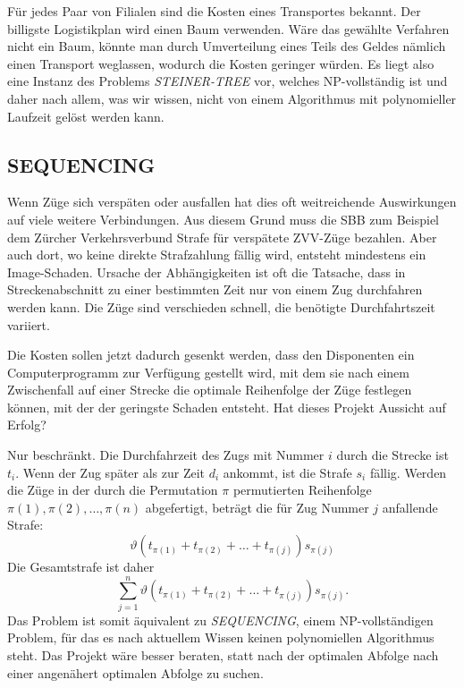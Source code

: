 \medskip

Für jedes Paar von Filialen sind die Kosten eines Transportes
bekannt. Der billigste Logistikplan wird einen Baum verwenden.
Wäre das gewählte Verfahren nicht ein Baum, könnte man
durch Umverteilung eines Teils des Geldes nämlich einen
Transport weglassen, wodurch die Kosten geringer würden.
Es liegt also eine Instanz des Problems {\it STEINER-TREE}
vor, welches NP-vollständig ist und daher nach allem, was
wir wissen, nicht von einem Algorithmus mit polynomieller
Laufzeit gelöst werden kann.

\subsection{SEQUENCING}
Wenn Züge sich verspäten oder ausfallen hat dies oft weitreichende
Auswirkungen auf viele weitere Verbindungen.
Aus diesem Grund muss die SBB zum Beispiel dem Zürcher Verkehrsverbund
Strafe für verspätete ZVV-Züge bezahlen. Aber auch dort, wo
keine direkte Strafzahlung fällig wird, entsteht mindestens ein
Image-Schaden. Ursache der Abhängigkeiten ist oft die Tatsache,
dass in Streckenabschnitt zu einer bestimmten Zeit nur von einem
Zug durchfahren werden kann. Die Züge sind verschieden schnell,
die benötigte Durchfahrtszeit variiert. 

Die Kosten sollen jetzt dadurch gesenkt werden, dass den Disponenten
ein Computerprogramm zur Verfügung gestellt wird, mit dem sie nach
einem Zwischenfall auf einer Strecke die optimale Reihenfolge der Züge
festlegen können, mit der der geringste Schaden entsteht.
Hat dieses Projekt Aussicht auf Erfolg?

\medskip

Nur beschränkt.
Die Durchfahrzeit des Zugs mit Nummer $i$ durch die Strecke ist $t_i$.
Wenn der Zug später als zur Zeit $d_i$ ankommt, ist die Strafe $s_i$
fällig.
Werden die Züge in der durch die Permutation $\pi$
permutierten Reihenfolge  $\pi(1),\pi(2),\dots,\pi(n)$ abgefertigt,
beträgt die für Zug Nummer $j$ anfallende Strafe:
\[
\vartheta(t_{\pi(1)}+t_{\pi(2)}+\dots+t_{\pi(j)})s_{\pi(j)}
\]
Die Gesamtstrafe ist daher
\[
\sum_{j=1}^n \vartheta(t_{\pi(1)}+t_{\pi(2)}+\dots+t_{\pi(j)})s_{\pi(j)}.
\]
Das Problem ist somit äquivalent zu {\it SEQUENCING}, einem
NP-vollständigen Problem, für das es nach aktuellem Wissen keinen
polynomiellen Algorithmus steht. Das Projekt wäre besser beraten,
statt nach der optimalen Abfolge nach einer angenähert optimalen Abfolge
zu suchen.

